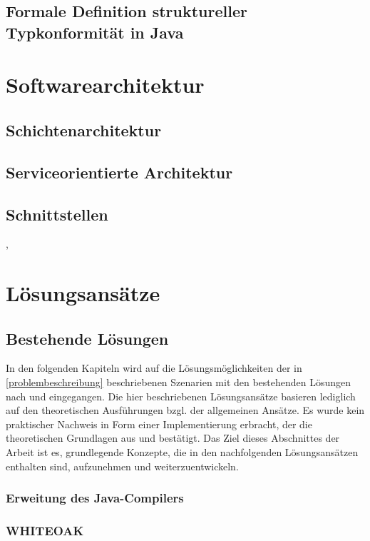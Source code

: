\documentclass[11pt, 
ngerman,
doublespacing,
chapterinoneline, %
consistentlayout, %
]{scrartcl}
\begin{document}
\subsection{Formale Definition struktureller Typkonformität in Java}
\cite{structconfjava}
\section{Softwarearchitektur}
\cite{Bas13}
\subsection{Schichtenarchitektur}\label{architektur}
\cite{modanwendungen}
\subsection{Serviceorientierte Architektur}\label{sarchitektur}
\cite{modanwendungen}
\subsection{Schnittstellen}
\cite{Bas13}, \cite{Bus96}
\section{Lösungsansätze}
\subsection{Bestehende Lösungen}
In den folgenden Kapiteln wird auf die Lösungsmöglichkeiten der in \ref{problembeschreibung} beschriebenen Szenarien mit den bestehenden Lösungen nach \cite{structconfjava} und \cite{whiteoak} eingegangen. Die hier beschriebenen Lösungsansätze basieren lediglich auf den theoretischen Ausführungen bzgl. der allgemeinen Ansätze. Es wurde kein praktischer Nachweis in Form einer Implementierung erbracht, der die theoretischen Grundlagen aus \cite{structconfjava} und \cite{whiteoak} bestätigt. Das Ziel dieses Abschnittes der Arbeit ist es, grundlegende Konzepte, die in den nachfolgenden Lösungsansätzen enthalten sind, aufzunehmen und weiterzuentwickeln.
\subsubsection{Erweitung des Java-Compilers}
\cite{structconfjava}

\subsubsection{WHITEOAK}
\cite{whiteoak}
\end{document}
